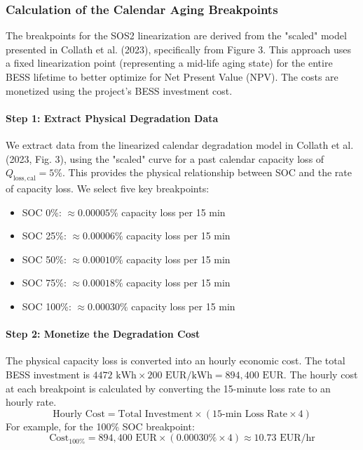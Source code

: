 \documentclass[11pt, a4paper]{article}
\begin{document}
\subsubsection{Calculation of the Calendar Aging Breakpoints}
The breakpoints for the SOS2 linearization are derived from the "scaled" model presented in Collath et al. (2023), specifically from Figure 3. This approach uses a fixed linearization point (representing a mid-life aging state) for the entire BESS lifetime to better optimize for Net Present Value (NPV). The costs are monetized using the project's BESS investment cost.

\paragraph{Step 1: Extract Physical Degradation Data}
We extract data from the linearized calendar degradation model in Collath et al. (2023, Fig. 3), using the "scaled" curve for a past calendar capacity loss of $Q_{\mathrm{loss,cal}} = 5\%$. This provides the physical relationship between SOC and the rate of capacity loss. We select five key breakpoints:

\begin{itemize}
    \item SOC 0\%: $\approx 0.00005\%$ capacity loss per 15 min
    \item SOC 25\%: $\approx 0.00006\%$ capacity loss per 15 min
    \item SOC 50\%: $\approx 0.00010\%$ capacity loss per 15 min
    \item SOC 75\%: $\approx 0.00018\%$ capacity loss per 15 min
    \item SOC 100\%: $\approx 0.00030\%$ capacity loss per 15 min
\end{itemize}

\paragraph{Step 2: Monetize the Degradation Cost}
The physical capacity loss is converted into an hourly economic cost. The total BESS investment is $4472 \text{ kWh} \times 200 \text{ EUR/kWh} = 894,400 \text{ EUR}$. The hourly cost at each breakpoint is calculated by converting the 15-minute loss rate to an hourly rate.
\begin{equation*}
    \text{Hourly Cost} = \text{Total Investment} \times (\text{15-min Loss Rate} \times 4)
\end{equation*}
For example, for the 100\% SOC breakpoint:
\begin{equation*}
    \text{Cost}_{100\%} = 894,400 \text{ EUR} \times (0.00030\% \times 4) \approx 10.73 \text{ EUR/hr}
\end{equation*}
\end{document}
